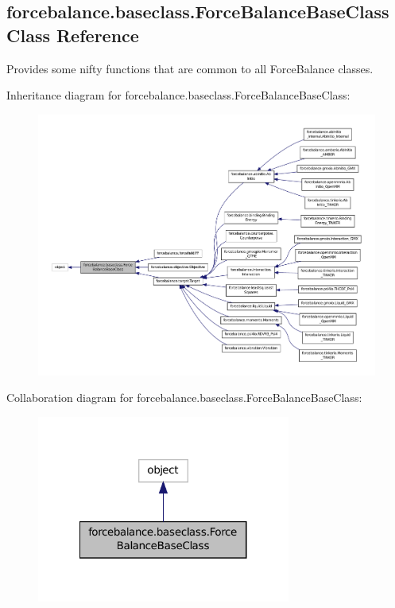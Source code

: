 \hypertarget{classforcebalance_1_1baseclass_1_1ForceBalanceBaseClass}{\subsection{forcebalance.\-baseclass.\-Force\-Balance\-Base\-Class Class Reference}
\label{classforcebalance_1_1baseclass_1_1ForceBalanceBaseClass}
}


Provides some nifty functions that are common to all Force\-Balance classes.  




Inheritance diagram for forcebalance.\-baseclass.\-Force\-Balance\-Base\-Class\-:
\nopagebreak
\begin{figure}[H]
\begin{center}
\leavevmode
\includegraphics[width=350pt]{classforcebalance_1_1baseclass_1_1ForceBalanceBaseClass__inherit__graph}
\end{center}
\end{figure}


Collaboration diagram for forcebalance.\-baseclass.\-Force\-Balance\-Base\-Class\-:
\nopagebreak
\begin{figure}[H]
\begin{center}
\leavevmode
\includegraphics[width=236pt]{classforcebalance_1_1baseclass_1_1ForceBalanceBaseClass__coll__graph}
\end{center}
\end{figure}
